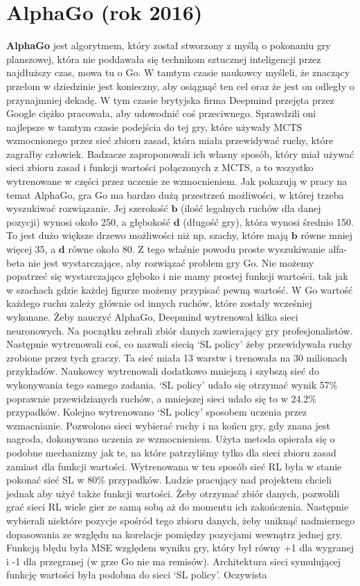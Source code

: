 \section{AlphaGo (rok 2016)}

\textbf{AlphaGo} jest algorytmem, który został stworzony z myślą o pokonaniu gry planszowej, która nie poddawała się technikom sztucznej inteligencji przez najdłuższy czas, mowa tu o Go. W tamtym czasie naukowcy myśleli, że znaczący przełom w dziedzinie jest konieczny, aby osiągnąć ten cel oraz że jest on odległy o przynajmniej dekadę. W tym czasie brytyjska firma Deepmind przejęta przez Google ciężko pracowała, aby udowodnić coś przeciwnego. Sprawdzili oni najlepsze w tamtym czasie podejścia do tej gry, które używały MCTS wzmocnionego przez sieć zbioru zasad, która miała przewidywać ruchy, które zagrałby człowiek. Badzacze zaproponowali ich własny sposób, który miał używać sieci zbioru zasad i funkcji wartości połączonych z MCTS, a to wszystko wytrenowane w części przez uczenie ze wzmocnieniem. Jak pokazują w pracy na temat AlphaGo, gra Go ma bardzo dużą przestrzeń możliwości, w której trzeba wyszukiwać rozwiązanie. Jej szerokość $\boldsymbol{b}$ (ilość legalnych ruchów dla danej pozycji) wynosi około 250, a głębokość $\boldsymbol{d}$ (długość gry), która wynosi średnio 150. To jest dużo większe drzewo możliwości niż np. szachy, które mają $\boldsymbol{b}$ równe mniej więcej 35, a $\boldsymbol{d}$ równe około 80. Z tego właśnie powodu proste wyszukiwanie alfa-beta nie jest wystarczające, aby rozwiązać problem gry Go. Nie możemy popatrzeć się wystarczająco głęboko i nie mamy prostej funkcji wartości, tak jak w szachach gdzie każdej figurze możemy przypisać pewną wartość. W Go wartość każdego ruchu zależy głównie od innych ruchów, które zostały wcześniej wykonane. Żeby nauczyć AlphaGo, Deepmind wytrenował kilka sieci neuronowych. Na początku zebrali zbiór danych zawierający gry profesjonalistów. Następnie wytrenowali coś, co nazwali siecią ‘SL policy’ żeby przewidywała ruchy zrobione przez tych graczy. Ta sieć miała 13 warstw i trenowała na 30 milionach przykładów. Naukowcy wytrenowali dodatkowo mniejszą i szybszą sieć do wykonywania tego samego zadania. ‘SL policy’ udało się otrzymać wynik 57\% poprawnie przewidzianych ruchów, a mniejszej sieci udało się to w 24.2\% przypadków. Kolejno wytrenowano ‘SL policy’ sposobem uczenia przez wzmacnianie. Pozwolono sieci wybierać ruchy i na końcu gry, gdy znana jest nagroda, dokonywano uczenia ze wzmocnieniem. Użyta metoda opierała się o podobne mechanizmy jak te, na które patrzyliśmy tylko dla sieci zbioru zasad zamiast dla funkcji wartości. Wytrenowana w ten sposób sieć RL była w stanie pokonać sieć SL w 80\% przypadków. Ludzie pracujący nad projektem chcieli jednak aby użyć także funkcji wartości. Żeby otrzymać zbiór danych, pozwolili grać sieci RL wiele gier ze samą sobą aż do momentu ich zakończenia. Następnie wybierali niektóre pozycje spośród tego zbioru danych, żeby uniknąć nadmiernego dopasowania ze względu na korelacje pomiędzy pozycjami wewnątrz jednej gry. Funkcją błędu była MSE względem wyniku gry, który był równy +1 dla wygranej i -1 dla przegranej (w grze Go nie ma remisów). Architektura sieci symulującej funkcję wartości była podobna do sieci ‘SL policy’. Oczywista 